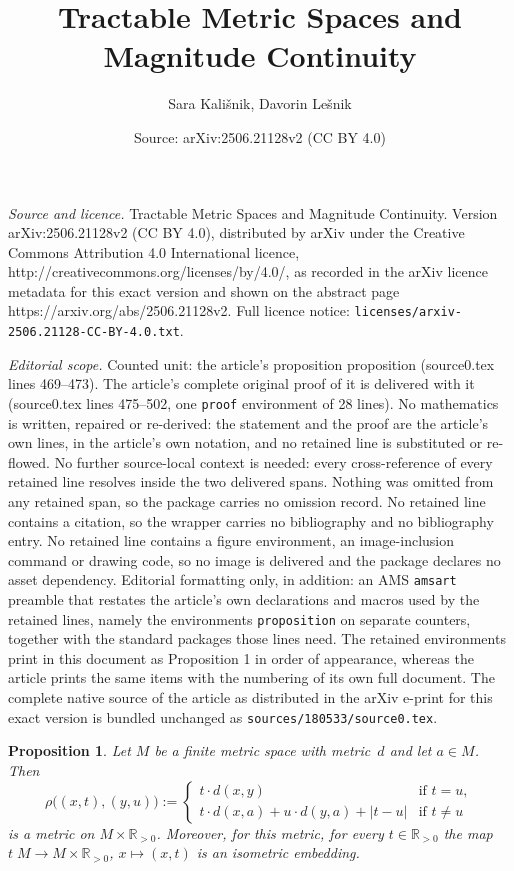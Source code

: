 \documentclass[10pt,a4paper]{amsart}
\title{Tractable Metric Spaces and Magnitude Continuity}
\author{Sara Kali\v{s}nik, Davorin Le\v{s}nik}
\date{Source: arXiv:2506.21128v2 (CC BY 4.0)}
\newtheorem{proposition}{Proposition}
\newcommand{\RR}{\mathbb{R}}
\begin{document}
\maketitle

\noindent\emph{Source and licence.} Tractable Metric Spaces and Magnitude Continuity. Version arXiv:2506.21128v2 (CC BY 4.0), distributed by arXiv under the Creative Commons Attribution 4.0 International licence, http://creativecommons.org/licenses/by/4.0/, as recorded in the arXiv licence metadata for this exact version and shown on the abstract page https://arxiv.org/abs/2506.21128v2. Full licence notice: \texttt{licenses/arxiv-2506.21128-CC-BY-4.0.txt}.\par\smallskip

\noindent\textit{Editorial scope.} Counted unit: the article's proposition proposition (source0.tex lines 469--473). The article's complete original proof of it is delivered with it (source0.tex lines 475--502, one \texttt{proof} environment of 28 lines). No mathematics is written, repaired or re-derived: the statement and the proof are the article's own lines, in the article's own notation, and no retained line is substituted or re-flowed.  No further source-local context is needed: every cross-reference of every retained line resolves inside the two delivered spans.  Nothing was omitted from any retained span, so the package carries no omission record.  No retained line contains a citation, so the wrapper carries no bibliography and no bibliography entry.  No retained line contains a figure environment, an image-inclusion command or drawing code, so no image is delivered and the package declares no asset dependency.  Editorial formatting only, in addition: an AMS \texttt{amsart} preamble that restates the article's own declarations and macros used by the retained lines, namely the environments \texttt{proposition} on separate counters, together with the standard packages those lines need.  The retained environments print in this document as Proposition 1 in order of appearance, whereas the article prints the same items with the numbering of its own full document.  The complete native source of the article as distributed in the arXiv e-print for this exact version is bundled unchanged as \texttt{sources/180533/source0.tex}.
\begin{proposition}
Let $M$ be a finite metric space with metric~$d$ and let $a \in M$. Then
\[\rho\big((x, t), (y, u)\big) := \begin{cases} t \cdot d(x, y) & \text{if $t = u$}, \\ t \cdot d(x, a) + u \cdot d(y, a) + |t - u| & \text{if $t \neq u$} \end{cases}\]
is a metric on $M \times \RR_{> 0}$. Moreover, for this metric, for every $t \in \RR_{> 0}$ the map $t\;\!M \to M \times \RR_{> 0}$, $x \mapsto (x, t)$ is an isometric embedding.
\end{proposition}
\end{document}
